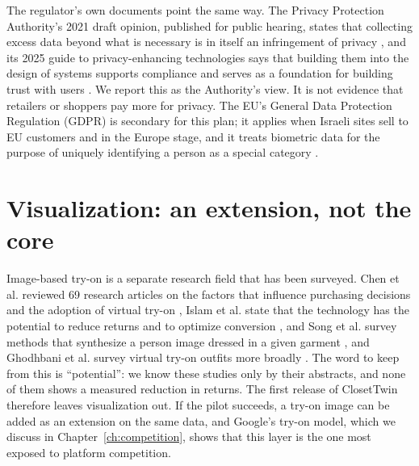 The regulator's own documents point the same way. The Privacy Protection Authority's 2021 draft opinion, published for public hearing, states that collecting excess data beyond what is necessary is in itself an infringement of privacy \cite{ppa_data_minimization2021}, and its 2025 guide to privacy-enhancing technologies says that building them into the design of systems supports compliance and serves as a foundation for building trust with users \cite{ppa_pets2025}. We report this as the Authority's view. It is not evidence that retailers or shoppers pay more for privacy. The EU's General Data Protection Regulation (GDPR) is secondary for this plan; it applies when Israeli sites sell to EU customers and in the Europe stage, and it treats biometric data for the purpose of uniquely identifying a person as a special category \cite{gdpr2016}.

\section{Visualization: an extension, not the core}\label{sec:product-viz}

Image-based try-on is a separate research field that has been surveyed. Chen et al. reviewed 69 research articles on the factors that influence purchasing decisions and the adoption of virtual try-on \cite{chen2024}, Islam et al. state that the technology has the potential to reduce returns and to optimize conversion \cite{islam2024}, and Song et al. survey methods that synthesize a person image dressed in a given garment \cite{song2023}, and Ghodhbani et al. survey virtual try-on outfits more broadly \cite{ghodhbani2022}. The word to keep from this is ``potential'': we know these studies only by their abstracts, and none of them shows a measured reduction in returns. The first release of ClosetTwin therefore leaves visualization out. If the pilot succeeds, a try-on image can be added as an extension on the same data, and Google's try-on model, which we discuss in Chapter~\ref{ch:competition}, shows that this layer is the one most exposed to platform competition.

\ctchapterend
